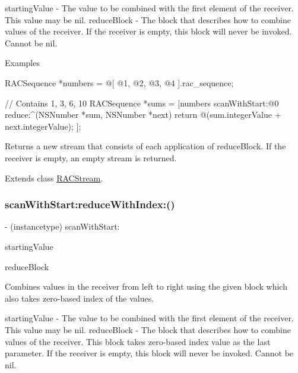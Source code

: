 starting\+Value -\/ The value to be combined with the first element of the receiver. This value may be {\ttfamily nil}. reduce\+Block -\/ The block that describes how to combine values of the receiver. If the receiver is empty, this block will never be invoked. Cannot be nil.

Examples \begin{DoxyVerb} RACSequence *numbers = @[ @1, @2, @3, @4 ].rac_sequence;

 // Contains 1, 3, 6, 10
 RACSequence *sums = [numbers scanWithStart:@0 reduce:^(NSNumber *sum, NSNumber *next) {
     return @(sum.integerValue + next.integerValue);
 }];
\end{DoxyVerb}


Returns a new stream that consists of each application of {\ttfamily reduce\+Block}. If the receiver is empty, an empty stream is returned. 

Extends class \mbox{\hyperlink{interface_r_a_c_stream_aa86990e9bc4cbc3dff2815f56b907b41}{R\+A\+C\+Stream}}.

\mbox{\label{category_r_a_c_stream_07_operations_08_a69cedeb6e96a6d4154f2256fdcbe27b1}} 
\subsubsection{\texorpdfstring{scan\+With\+Start\+:reduce\+With\+Index\+:()}{scanWithStart:reduceWithIndex:()}\hspace{0.1cm}{\footnotesize\ttfamily [1/3]}}
{\footnotesize\ttfamily -\/ (instancetype) scan\+With\+Start\+: \begin{DoxyParamCaption}\item[{(id)}]{starting\+Value }\item[{reduceWithIndex:(id($^\wedge$)(id running, id next, N\+S\+U\+Integer index))}]{reduce\+Block }\end{DoxyParamCaption}}

Combines values in the receiver from left to right using the given block which also takes zero-\/based index of the values.

starting\+Value -\/ The value to be combined with the first element of the receiver. This value may be {\ttfamily nil}. reduce\+Block -\/ The block that describes how to combine values of the receiver. This block takes zero-\/based index value as the last parameter. If the receiver is empty, this block will never be invoked. Cannot be nil.


